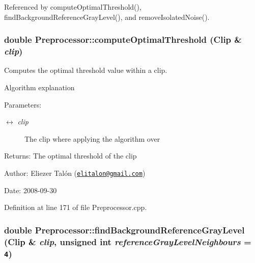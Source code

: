 Referenced by computeOptimalThreshold(), findBackgroundReferenceGrayLevel(), and removeIsolatedNoise().\hypertarget{class_preprocessor_84fcd2ccbbecea37f4bcdae5d7547ecd}{
\subsubsection[computeOptimalThreshold]{\setlength{\rightskip}{0pt plus 5cm}double Preprocessor::computeOptimalThreshold ({\bf Clip} \& {\em clip})}}
\label{class_preprocessor_84fcd2ccbbecea37f4bcdae5d7547ecd}


Computes the optimal threshold value within a clip. 

Algorithm explanation

\begin{Desc}
\item[Parameters:]
\begin{description}
\item[\mbox{$\leftrightarrow$} {\em clip}]The clip where applying the algorithm over\end{description}
\end{Desc}
\begin{Desc}
\item[Returns:]The optimal threshold of the clip\end{Desc}
\begin{Desc}
\item[Author:]Eliezer Talón (\href{mailto:elitalon@gmail.com}{\tt elitalon@gmail.com}) \end{Desc}
\begin{Desc}
\item[Date:]2008-09-30 \end{Desc}


Definition at line 171 of file Preprocessor.cpp.\hypertarget{class_preprocessor_95613606bb7882b2ac821dae5f8327b9}{
\subsubsection[findBackgroundReferenceGrayLevel]{\setlength{\rightskip}{0pt plus 5cm}double Preprocessor::findBackgroundReferenceGrayLevel ({\bf Clip} \& {\em clip}, \/  unsigned int {\em referenceGrayLevelNeighbours} = {\tt 4})}}
\label{class_preprocessor_95613606bb7882b2ac821dae5f8327b9}



